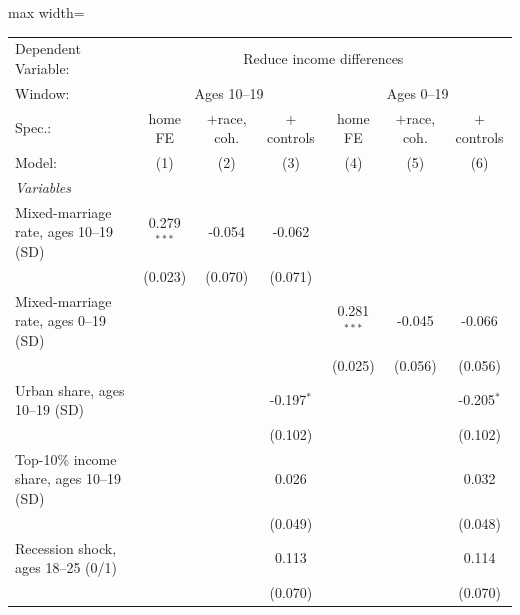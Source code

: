       \begin{adjustbox}{max width=\linewidth}
   \begin{tabular}{lcccccc}
      \tabularnewline \midrule \midrule
      Dependent Variable: & \multicolumn{6}{c}{Reduce income differences}\\
      Window: & \multicolumn{3}{c}{Ages 10--19} & \multicolumn{3}{c}{Ages 0--19} \\ 
      Spec.:                                   & home FE       & $+$race, coh. & $+$controls  & home FE       & $+$race, coh. & $+$controls \\   
      Model:                                   & (1)           & (2)           & (3)          & (4)           & (5)           & (6)\\  
      \midrule
      \emph{Variables}\\
      Mixed-marriage rate, ages 10--19 (SD)    & 0.279$^{***}$ & -0.054        & -0.062       &               &               &   \\   
                                               & (0.023)       & (0.070)       & (0.071)      &               &               &   \\   
      Mixed-marriage rate, ages 0--19 (SD)     &               &               &              & 0.281$^{***}$ & -0.045        & -0.066\\   
                                               &               &               &              & (0.025)       & (0.056)       & (0.056)\\   
      Urban share, ages 10--19 (SD)            &               &               & -0.197$^{*}$ &               &               & -0.205$^{*}$\\   
                                               &               &               & (0.102)      &               &               & (0.102)\\   
      Top-10\% income share, ages 10--19 (SD)  &               &               & 0.026        &               &               & 0.032\\   
                                               &               &               & (0.049)      &               &               & (0.048)\\   
      Recession shock, ages 18--25 (0/1)       &               &               & 0.113        &               &               & 0.114\\   
                                               &               &               & (0.070)      &               &               & (0.070)\\   

\end{tabular}
\end{adjustbox}
